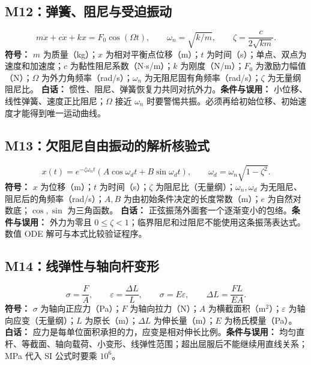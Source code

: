 \documentclass[UTF8,zihao=-4,openany,oneside,fontset=windows]{ctexbook}
\begin{document}
\subsection{M12：弹簧、阻尼与受迫振动}
\begin{equation}
m\ddot x+c\dot x+kx=F_0\cos(\Omega t),\qquad \omega_n=\sqrt{k/m},\qquad \zeta=\frac{c}{2\sqrt{km}}.
\end{equation}
\textbf{符号：} $m$ 为质量（kg）；$x$ 为相对平衡点位移（m）；$t$ 为时间（s）；单点、双点为速度和加速度；$c$ 为黏性阻尼系数（N$\cdot$s/m）；$k$ 为刚度（N/m）；$F_0$ 为激励力幅值（N）；$\Omega$ 为外力角频率（rad/s）；$\omega_n$ 为无阻尼固有角频率（rad/s）；$\zeta$ 为无量纲阻尼比。
\textbf{白话：} 惯性、阻尼、弹簧恢复力共同对抗外力。\textbf{条件与误用：} 小位移、线性弹簧、速度正比阻尼；$\Omega$ 接近 $\omega_n$ 时要警惕共振。必须再给初始位移、初始速度才能得到唯一运动曲线。

\subsection{M13：欠阻尼自由振动的解析核验式}
\begin{equation}
x(t)=e^{-\zeta\omega_nt}\left(A\cos\omega_dt+B\sin\omega_dt\right),\qquad \omega_d=\omega_n\sqrt{1-\zeta^2}.
\end{equation}
\textbf{符号：} $x$ 为位移（m）；$t$ 为时间（s）；$\zeta$ 为阻尼比（无量纲）；$\omega_n,\omega_d$ 为无阻尼、阻尼后的角频率（rad/s）；$A,B$ 为由初始条件决定的长度常数（m）；$e$ 为自然对数底；$\cos,\sin$ 为三角函数。
\textbf{白话：} 正弦振荡外面套一个逐渐变小的包络。\textbf{条件与误用：} 外力为零且 $0\leq\zeta<1$；临界阻尼和过阻尼不能使用这条振荡表达式。数值 ODE 解可与本式比较验证程序。

\subsection{M14：线弹性与轴向杆变形}
\begin{equation}
\sigma=\frac{F}{A},\qquad \varepsilon=\frac{\Delta L}{L},\qquad \sigma=E\varepsilon,\qquad \Delta L=\frac{FL}{EA}.
\end{equation}
\textbf{符号：} $\sigma$ 为轴向正应力（Pa）；$F$ 为轴向拉力（N）；$A$ 为横截面积（m$^2$）；$\varepsilon$ 为轴向应变（无量纲）；$L$ 为原长（m）；$\Delta L$ 为伸长量（m）；$E$ 为杨氏模量（Pa）。
\textbf{白话：} 应力是每单位面积承担的力，应变是相对伸长比例。\textbf{条件与误用：} 均匀直杆、等截面、轴向载荷、小变形、线弹性范围；超出屈服后不能继续用直线关系；MPa 代入 SI 公式时要乘 $10^6$。
\end{document}
